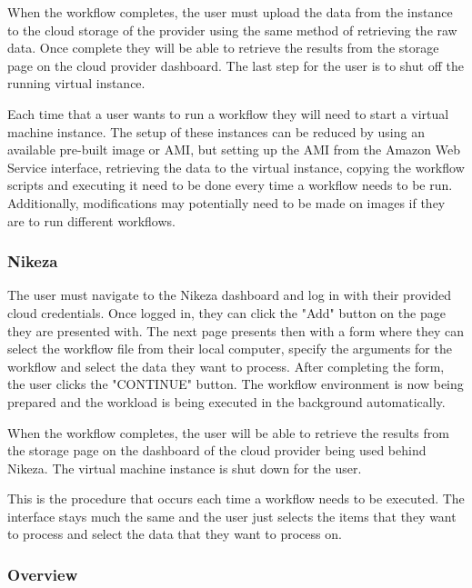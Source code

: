 When the workflow completes, the user must upload the data from the instance to the cloud storage of the provider using the same method of retrieving the raw data. Once complete they will be able to retrieve the results from the storage page on the cloud provider dashboard. The last step for the user is to shut off the running virtual instance.

Each time that a user wants to run a workflow they will need to start a virtual machine instance. The setup of these instances can be reduced by using an available pre-built image or AMI, but setting up the AMI from the Amazon Web Service interface, retrieving the data to the virtual instance, copying the workflow scripts and executing it need to be done every time a workflow needs to be run. Additionally, modifications may potentially need to be made on images if they are to run different workflows.

\subsubsection{Nikeza}
The user must navigate to the Nikeza dashboard and log in with their provided cloud credentials. Once logged in, they can click the "Add" button on the page they are presented with. The next page presents then with a form where they can select the workflow file from their local computer, specify the arguments for the workflow and select the data they want to process. After completing the form, the user clicks the "CONTINUE" button. The workflow environment is now being prepared and the workload is being executed in the background automatically.

When the workflow completes, the user will be able to retrieve the results from the storage page on the dashboard of the cloud provider being used behind Nikeza. The virtual machine instance is shut down for the user.

This is the procedure that occurs each time a workflow needs to be executed. The interface stays much the same and the user just selects the items that they want to process and select the data that they want to process on.

\subsubsection{Overview}


